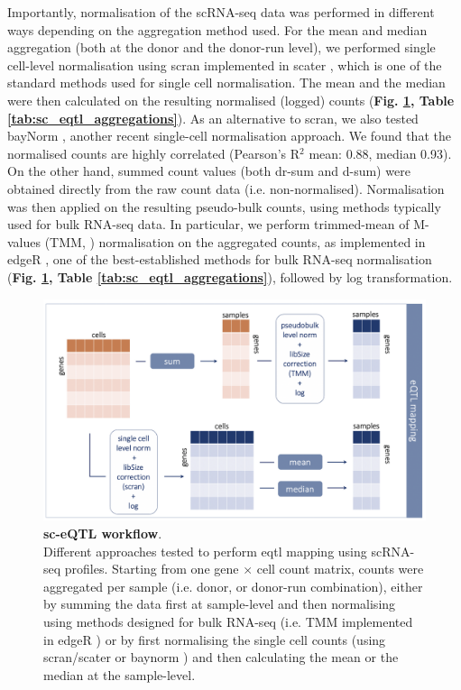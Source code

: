 Importantly, normalisation of the scRNA-seq data was performed in different ways depending on the aggregation method used. 
For the mean and median aggregation (both at the donor and the donor-run level), we performed single cell-level normalisation using scran \cite{lun2016pooling} implemented in scater \cite{mccarthy2017scater}, which is one of the standard methods used for single cell normalisation. 
The mean and the median were then calculated on the resulting normalised (logged) counts (\textbf{Fig. \ref{fig:sc_qtl_workflow}, Table \ref{tab:sc_eqtl_aggregations}}). 
As an alternative to scran, we also tested bayNorm \cite{tang2020baynorm}, another recent single-cell normalisation approach. 
We found that the normalised counts are highly correlated (Pearson's R$^2$ mean: 0.88, median 0.93). 
On the other hand, summed count values (both dr-sum and d-sum) were obtained directly from the raw count data (i.e. non-normalised). 
Normalisation was then applied on the resulting pseudo-bulk counts, using methods typically used for bulk RNA-seq data.
In particular, we perform trimmed-mean of M-values (TMM, \cite{robinson2010scaling}) normalisation on the aggregated counts, as implemented in edgeR \cite{robinson2010edger}, one of the best-established methods for bulk RNA-seq normalisation (\textbf{Fig. \ref{fig:sc_qtl_workflow}, Table \ref{tab:sc_eqtl_aggregations}}), followed by log transformation.

\begin{figure}[h]
\centering
\includegraphics[width=15.5cm]{Chapter3/Fig/sc_qtl_workflow_white.png}
\caption[sc-eQTL workflow]{\textbf{sc-eQTL workflow}.\\
Different approaches tested to perform \gls{eqtl} mapping using scRNA-seq profiles.
Starting from one gene $\times$ cell count matrix, counts were aggregated per sample (i.e. donor, or donor-run combination), either by summing the data first at sample-level and then normalising using methods designed for bulk RNA-seq (i.e. TMM implemented in edgeR \cite{robinson2010scaling, robinson2010edger}) or by first normalising the single cell counts (using scran/scater \cite{lun2016pooling, mccarthy2017scater} or baynorm \cite{tang2020baynorm}) and then calculating the mean or the median at the sample-level. }
\label{fig:sc_qtl_workflow}
\end{figure}


